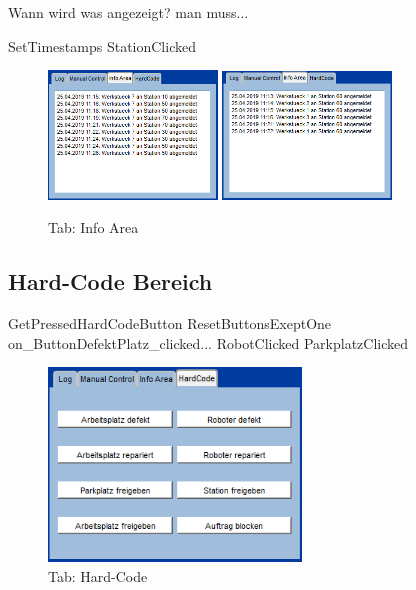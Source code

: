 Wann wird was angezeigt? man muss...

SetTimestamps
StationClicked
\begin{figure}[htb]
    \centering
    \includegraphics[width=0.4\textwidth]{Abbildungen/TimestampsWerkstueck.png}
    \includegraphics[width=0.4\textwidth]{Abbildungen/TimestampsStation.png}
    \caption{Tab: Info Area}		
    \label{fig:InfoArea}
\end{figure}

\subsection{Hard-Code Bereich}
\label{sec:HardCode}
GetPressedHardCodeButton
ResetButtonsExeptOne
on_ButtonDefektPlatz_clicked...
RobotClicked
ParkplatzClicked

\begin{figure}[htb]
    \centering
    \includegraphics[width=0.6\textwidth]{Abbildungen/HardCode.png}
    \caption{Tab: Hard-Code}		
    \label{fig:HardCode}
\end{figure}

